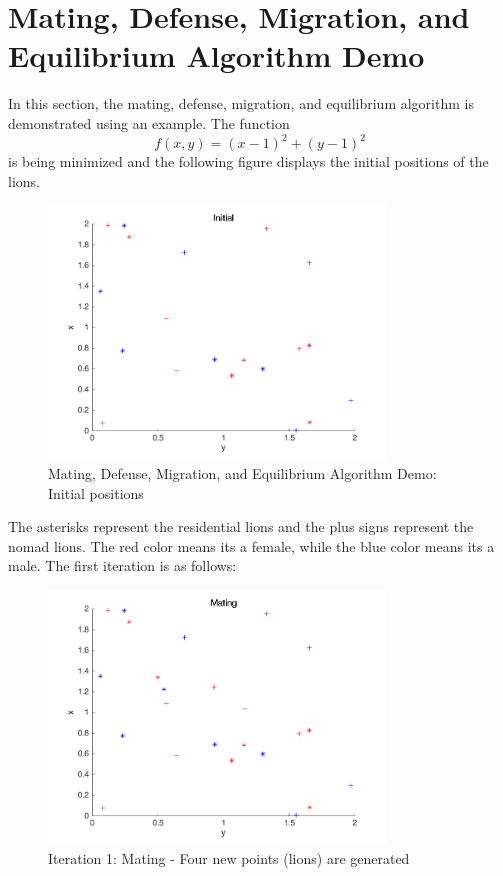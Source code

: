 \section{Mating, Defense, Migration, and Equilibrium Algorithm Demo}
In this section, the mating, defense, migration, and equilibrium algorithm is demonstrated using an example. The function $$f(x,y)=(x-1)^2 + (y-1)^2$$ is being minimized and the following figure displays the initial positions of the lions.
\begin{figure}[H]
\begin{center}
\includegraphics[width=0.8\textwidth]{img/mdme/init}
\caption{Mating, Defense, Migration, and Equilibrium Algorithm Demo: Initial positions}
\end{center}
\end{figure}
The asterisks represent the residential lions and the plus signs represent the nomad lions. The red color means its a female, while the blue color means its a male. The first iteration is as follows:

\begin{figure}[H]
\begin{center}
\includegraphics[width=0.8\textwidth]{img/mdme/mating1}
\caption{Iteration 1: Mating - Four new points (lions) are generated}
\end{center}
\end{figure}

